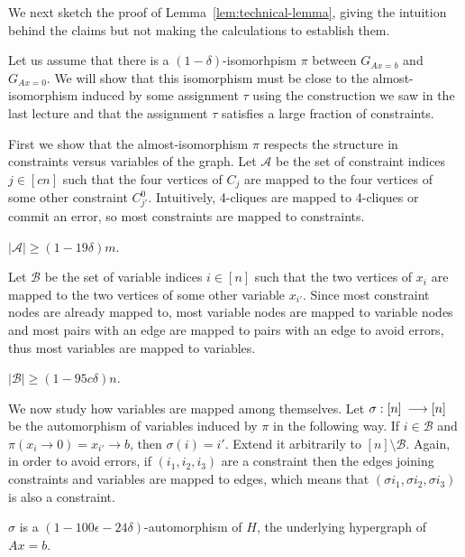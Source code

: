 \documentclass[a4paper,twoside,justified]{tufte-handout}
\newcommand{\Glin}[1]{G_{Ax=#1}}
\begin{document}
We next sketch the proof of Lemma~\ref{lem:technical-lemma}, giving the intuition behind the claims but not making the calculations to establish them.

Let us assume that there is a $(1-\delta)$-isomorhpism $\pi$ between $\Glin{b}$ and $\Glin{0}$. We will show that this isomorphism must be close to the almost-isomorphism induced by some assignment $\tau$ using the construction we saw in the last lecture and that the assignment $\tau$ satisfies a large fraction of constraints.

First we show that the almost-isomorphism $\pi$ respects the structure in constraints versus variables of the graph.
Let $\mathcal{A}$ be the set of constraint indices $j\in[cn]$ such that the four vertices of $C_j$ are mapped to the four vertices of some other constraint $C_{j'}^0$. Intuitively, 4-cliques are mapped to 4-cliques or commit an error, so most constraints are mapped to constraints.

\begin{claim}
  \label{claim:constraints-map-to-constraints}
  $|\mathcal{A}| \geq (1-19\delta) m$.
\end{claim}

Let $\mathcal{B}$ be the set of variable indices $i\in [n]$ such that the two vertices of $x_i$ are mapped to the two vertices of some other variable $x_{i'}$. Since most constraint nodes are already mapped to, most variable nodes are mapped to variable nodes and most pairs with an edge are mapped to pairs with an edge to avoid errors, thus most variables are mapped to variables.

\begin{claim}
  \label{claim:variables-map-to-variables}
  $|\mathcal{B}| \geq (1-95c\delta) n$.
\end{claim}

We now study how variables are mapped among themselves. Let $\sigma:[n]\:\longrightarrow [n]$ be the automorphism of variables induced by $\pi$ in the following way. If $i\in\mathcal{B}$ and $\pi(x_i\to0)=x_{i'}\to b$, then $\sigma(i)=i'$. Extend it arbitrarily to $[n]\setminus \mathcal{B}$. Again, in order to avoid errors, if $(i_1,i_2,i_3)$ are a constraint then the edges joining constraints and variables are mapped to edges, which means that $(\sigma i_1, \sigma i_2, \sigma i_3)$ is also a constraint.

\begin{claim}
  \label{claim:sigma-almost-automorphism}
  $\sigma$ is a $(1-100\epsilon-24\delta)$-automorphism of $H$, the underlying hypergraph of $Ax=b$.
\end{claim}
\end{document}
